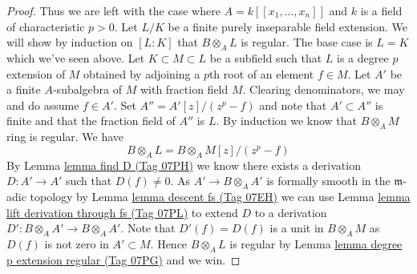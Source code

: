 \documentclass{amsart}
\theoremstyle{plain}
\theoremstyle{definition}
\theoremstyle{remark}
\numberwithin{equation}{subsection}
\begin{document}
\begin{proof}
\medskip\noindent
Thus we are left with the case where $A = k[[x_1, \ldots, x_n]]$
and $k$ is a field of characteristic $p > 0$.
Let $L/K$ be a finite purely inseparable field extension.
We will show by induction on $[L : K]$ that $B \otimes_A L$
is regular. The base case is $L = K$ which we've seen above.
Let $K \subset M \subset L$ be a subfield such that
$L$ is a degree $p$ extension of $M$ obtained by adjoining a $p$th root
of an element $f \in M$. Let $A'$ be a finite $A$-subalgebra
of $M$ with fraction field $M$. Clearing denominators, we may and do assume
$f \in A'$. Set $A'' = A'[z]/(z^p -f)$ and note that $A' \subset A''$
is finite and that the fraction field of $A''$ is $L$.
By induction we know that $B \otimes_A M$ ring is regular.
We have
$$
B \otimes_A L = B \otimes_A M[z]/(z^p - f)
$$
By Lemma \href{https://stacks.math.columbia.edu/tag/07PH}{lemma find D (Tag 07PH)} we know there exists a derivation
$D : A' \to A'$ such that $D(f) \not = 0$. As $A' \to B \otimes_A A'$
is formally smooth in the $\mathfrak m$-adic topology by
Lemma \href{https://stacks.math.columbia.edu/tag/07EH}{lemma descent fs (Tag 07EH)}
we can use
Lemma \href{https://stacks.math.columbia.edu/tag/07PL}{lemma lift derivation through fs (Tag 07PL)}
to extend $D$ to a derivation $D' : B \otimes_A A' \to B \otimes_A A'$.
Note that $D'(f) = D(f)$ is a unit in $B \otimes_A M$ as $D(f)$
is not zero in $A' \subset M$. Hence $B \otimes_A L$ is regular by
Lemma \href{https://stacks.math.columbia.edu/tag/07PG}{lemma degree p extension regular (Tag 07PG)} and we win.
\end{proof}
\end{document}

